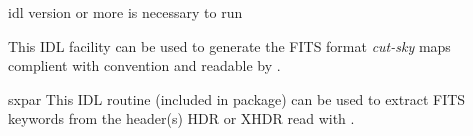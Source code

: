 \begin{codedescription}

\end{codedescription}



\begin{related}
  \begin{sulist}{} %
  \item[idl] version \idlversion or more is necessary to run \facname
  \item[\htmlref{write\_fits\_cut4}{idl:write_fits_cut4}] This \healpix IDL
facility can be used to generate the FITS format {\em cut-sky} maps complient
with \healpix convention and readable by \facname.

    \item[sxpar] This IDL routine (included in \healpix package) can be
  used to extract FITS keywords from the header(s) HDR or XHDR read with \facname.
  \end{sulist}
\end{related}




